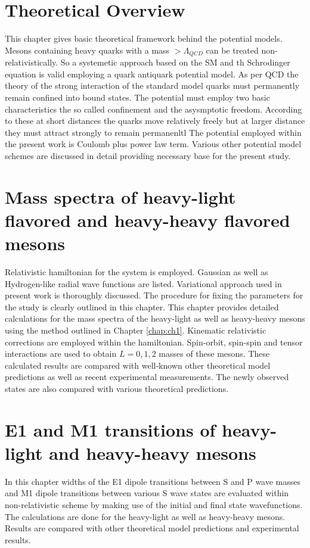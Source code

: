 \documentclass[draft,11pt]{scrreprt}
\begin{document}
\chapter{Theoretical Overview\label{chap:ch1}}
This chapter gives basic theoretical framework behind the potential models. Mesons containing heavy quarks with a mass $> \Lambda_{QCD}$ can be treated non-relativistically. So a systemetic approach based on the SM and th Schrodinger equation is valid employing a quark antiquark potential model. As per QCD the theory of the strong interaction of the standard model quarks must permanently remain confined into bound states. The potential must employ two basic characteristics the so called confinement and the asysmptotic freedom. According to these at short distances the quarks move relatively freely but at larger distance they must attract strongly to remain permanenltl The potential employed within the present work is Coulomb plus power law term. Various other potential model schemes are discussed in detail providing necessary base for the present study. 

\chapter{Mass spectra of heavy-light flavored and heavy-heavy flavored mesons}
Relativistic hamiltonian for the system is employed. Gaussian as well as Hydrogen-like radial wave functions are listed. Variational approach used in present work is thoroughly discussed. The procedure for fixing the parameters for the study is clearly outlined in this chapter. This chapter provides detailed calculations for the mass spectra of the heavy-light as well as heavy-heavy mesons using the method outlined in Chapter \ref{chap:ch1}. Kinematic relativistic corrections are employed within the hamiltonian. Spin-orbit, spin-spin and tensor interactions are used to obtain $L=0,1,2$ masses of these mesons. These calculated results are compared with well-known other theoretical model predictions as well as recent experimental measurements. The newly observed states are also compared with various theoretical predictions.

\chapter{E1 and M1 transitions of heavy-light and heavy-heavy mesons}
In this chapter widths of the E1 dipole transitions between S and P wave masses and M1 dipole transitions between various S wave states are evaluated within non-relativistic scheme by making use of the initial and final state wavefunctions. The calculations are done for the heavy-light as well as heavy-heavy mesons. Results are compared with other theoretical model predictions and experimental results. 
\end{document}
